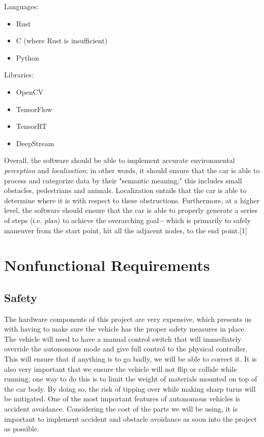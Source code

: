 \documentclass[onecolumn, draftclsnofoot,10pt]{IEEEtran}
\begin{document}
    Languages:
    
    \begin{itemize}
    \item Rust
    \item C (where Rust is insufficient)
    \item Python
    \end{itemize}
    
  \noindent Libraries:
    
    \begin{itemize}
    \item OpenCV
    \item TensorFlow
    \item TensorRT
    \item DeepStream
    \end{itemize}
    
    \bigskip

    \noindent Overall, the software should be able to implement accurate environmental \textit{perception} and \textit{localization}; in other words, it should ensure that the car is able to process and categorize data by their "semantic meaning;" this includes small obstacles, pedestrians and animals. Localization entails that the car is able to determine where it is with respect to these obstructions. Furthermore, at a higher level, the software should ensure that the car is able to properly generate a series of steps (i.e. \textit{plan}) to achieve the overarching goal - which is primarily to safely maneuver from the start point, hit all the adjacent nodes, to the end point.[1]

\bigskip

\section{Nonfunctional Requirements}

\bigskip

\subsection{Safety}
    The hardware components of this project are very expensive, which presents us with having to make sure the vehicle has the proper safety measures in place. The vehicle will need to have a manual control switch that will immediately override the autonomous mode and give full control to the physical controller. This will ensure that if anything is to go badly, we will be able to correct it. It is also very important that we ensure the vehicle will not flip or collide while running; one way to do this is to limit the weight of materials mounted on top of the car body. By doing so, the risk of tipping over while making sharp turns will be mitigated. One of the most important features of autonomous vehicles is accident avoidance. Considering the cost of the parts we will be using, it is important to implement accident and obstacle avoidance as soon into the project as possible. 
    
\end{document}
